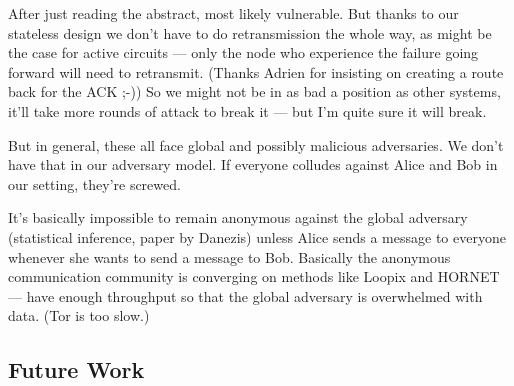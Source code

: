 After just reading the abstract, most likely vulnerable. But thanks to 
our stateless design we don't have to do retransmission the whole way, 
as might be the case for active circuits --- only the node who 
experience the failure going forward will need to retransmit. (Thanks 
Adrien for insisting on creating a route back for the ACK ;-)) So we 
might not be in as bad a position as other systems, it'll take more 
rounds of attack to break it --- but I'm quite sure it will break.

But in general, these all face global and possibly malicious 
adversaries. We don't have that in our adversary model. If everyone 
colludes against Alice and Bob in our setting, they're screwed.

It's basically impossible to remain anonymous against the global 
adversary (statistical inference, paper by Danezis) unless Alice sends a 
message to everyone whenever she wants to send a message to Bob. 
Basically the anonymous communication community is converging on methods 
like Loopix and HORNET --- have enough throughput so that the global 
adversary is overwhelmed with data. (Tor is too slow.)

\subsection{Future Work}


